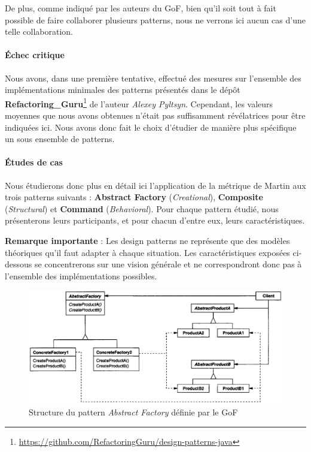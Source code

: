 \documentclass{scrartcl}
\begin{document}
    De plus, comme indiqué par les auteurs du GoF, bien qu'il soit tout à fait possible de faire collaborer plusieurs patterns, nous ne verrons ici aucun cas d'une telle collaboration.
    
    \paragraph{Échec critique}Nous avons, dans une première tentative, effectué des mesures sur l'ensemble des implémentations minimales des patterns présentés dans le dépôt \textbf{Refactoring\_Guru}\footnote{\url{https://github.com/RefactoringGuru/design-patterns-java}} de l'auteur \emph{Alexey Pyltsyn}. Cependant, les valeurs moyennes que nous avons obtenues n'était pas suffisamment révélatrices pour être indiquées ici. Nous avons donc fait le choix d'étudier de manière plus spécifique un sous ensemble de patterns.

    \paragraph{Études de cas}Nous étudierons donc plus en détail ici l'application de la métrique de Martin aux trois patterns suivants : \textbf{Abstract Factory} (\emph{Creational}), \textbf{Composite} (\emph{Structural}) et \textbf{Command} (\emph{Behavioral}). Pour chaque pattern étudié, nous présenterons leurs participants, et pour chacun d'entre eux, leurs caractéristiques.

    \textbf{Remarque importante} : Les design patterns ne représente que des modèles théoriques qu'il faut adapter à chaque situation. Les caractéristiques exposées ci-dessous se concentrerons sur une vision générale et ne correspondront donc pas à l'ensemble des implémentations possibles.
    
    \begin{figure}[H]
        \centering
        \includegraphics[scale=0.35]{img/pattern/abstract_factory.png}
        \caption{Structure du pattern \emph{Abstract Factory} définie par le GoF}
    \end{figure}
\end{document}
